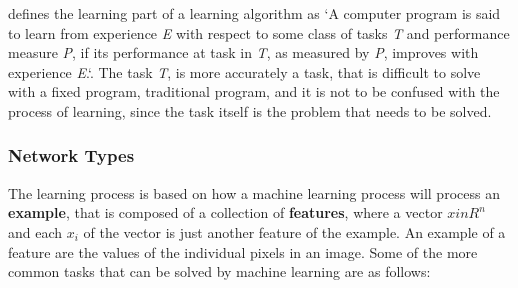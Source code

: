 \documentclass{article}
\begin{document}
\cite{mitchel97} defines the learning part of a learning algorithm as `A computer program is said to learn from experience \textit{E} with respect to some class of tasks \textit{T} and performance measure \textit{P}, if its performance at task in \textit{T}, as measured by \textit{P}, improves with experience \textit{E}.`. The task \textit{T}, is more accurately a task, that is difficult to solve with a fixed program, traditional program, and it is not to be confused with the process of learning, since the task itself is the problem that needs to be solved.

\subsubsection{Network Types}
The learning process is based on how a machine learning process will process an \textbf{example}, that is composed of a collection of \textbf{features}, where a vector $x in R^n$ and each $x_i$ of the vector is just another feature of the example. An example of a feature are the values of the individual pixels in an image. Some of the more common tasks that can be solved by machine learning are as follows:
\end{document}
